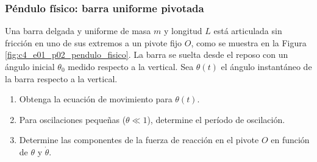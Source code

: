 \subsubsection{Péndulo físico: barra uniforme pivotada}

Una barra delgada y uniforme de masa $m$ y longitud $L$ está articulada sin fricción en uno de sus extremos a un pivote fijo $O$, como se muestra en la Figura \ref{fig:c4_e01_p02_pendulo_fisico}. La barra se suelta desde el reposo con un ángulo inicial $\theta_0$ medido respecto a la vertical. Sea $\theta(t)$ el ángulo instantáneo de la barra respecto a la vertical.

\begin{enumerate}
    \item Obtenga la ecuación de movimiento para $\theta(t)$.
    \item Para oscilaciones pequeñas ($\theta \ll 1$), determine el período de oscilación.
    \item Determine las componentes de la fuerza de reacción en el pivote $O$ en función de $\theta$ y $\dot{\theta}$.
\end{enumerate}

